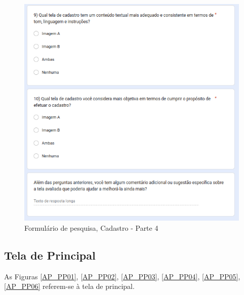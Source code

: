 \begin{figure}[!h]
	\begin{center}
	    \includegraphics[scale=0.6]{figs/Form/12.png}
	\end{center}
	\caption{\label{AP_CP04}Formulário de pesquisa, Cadastro - Parte 4}
\end{figure}

\newpage

\subsection{Tela de Principal}

As Figuras \ref{AP_PP01}, \ref{AP_PP02}, \ref{AP_PP03}, \ref{AP_PP04}, \ref{AP_PP05}, \ref{AP_PP06} referem-se à tela de principal.

